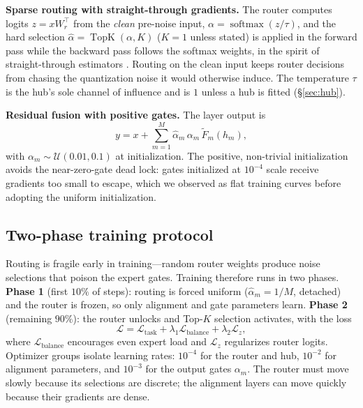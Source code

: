 \documentclass[10pt,twoside]{article}
\newcommand{\topk}{\operatorname{TopK}}
\newcommand{\softmax}{\operatorname{softmax}}
\theoremstyle{definition}
\theoremstyle{plain}
\theoremstyle{remark}
\begin{document}
\textbf{Sparse routing with straight-through gradients.} The router computes logits $z = x W_r^\top$ from the \emph{clean} pre-noise input, $\alpha = \softmax(z/\tau)$, and the hard selection $\hat\alpha = \topk(\alpha, K)$ ($K{=}1$ unless stated) is applied in the forward pass while the backward pass follows the softmax weights, in the spirit of straight-through estimators \citep{bengio2013}. Routing on the clean input keeps router decisions from chasing the quantization noise it would otherwise induce. The temperature $\tau$ is the hub's sole channel of influence and is $1$ unless a hub is fitted (\S\ref{sec:hub}).

\textbf{Residual fusion with positive gates.} The layer output is
\begin{equation}
\label{eq:fuse}
y = x + \sum_{m=1}^{M} \hat\alpha_m \, \alpha_m \, \tilde F_m(h_m),
\end{equation}
with $\alpha_m \sim \mathcal{U}(0.01, 0.1)$ at initialization. The positive, non-trivial initialization avoids the near-zero-gate dead lock: gates initialized at $10^{-4}$ scale receive gradients too small to escape, which we observed as flat training curves before adopting the uniform initialization.

\subsection{Two-phase training protocol}
\label{sec:training}

Routing is fragile early in training---random router weights produce noise selections that poison the expert gates. Training therefore runs in two phases. \textbf{Phase 1} (first $10\%$ of steps): routing is forced uniform ($\hat\alpha_m = 1/M$, detached) and the router is frozen, so only alignment and gate parameters learn. \textbf{Phase 2} (remaining $90\%$): the router unlocks and Top-$K$ selection activates, with the loss
\begin{equation}
\label{eq:loss}
\mathcal{L} = \mathcal{L}_{\text{task}} + \lambda_1 \mathcal{L}_{\text{balance}} + \lambda_2 \mathcal{L}_{z},
\end{equation}
where $\mathcal{L}_{\text{balance}}$ encourages even expert load and $\mathcal{L}_{z}$ regularizes router logits. Optimizer groups isolate learning rates: $10^{-4}$ for the router and hub, $10^{-2}$ for alignment parameters, and $10^{-3}$ for the output gates $\alpha_m$. The router must move slowly because its selections are discrete; the alignment layers can move quickly because their gradients are dense.
\end{document}
